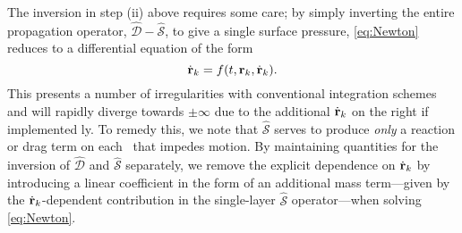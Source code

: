 The inversion in step (ii) above requires some care; by simply inverting the entire propagation operator, $\hat{\mathcal{D}} - \hat{\mathcal{S}}$, to give a single surface pressure, \cref{eq:Newton} reduces to a differential equation of the form
\begin{equation}
  \label{eq:malformed}
  \dot{\vb{r}}_k = f(t, \vb{r}_k, \dot{\vb{r}}_k).
\end{equation}
This presents a number of irregularities with conventional integration schemes and will rapidly diverge towards $\pm \infty$ due to the additional $\dot{\vb{r}}_k$ on the right if implemented \naive ly.
To remedy this, we note that $\hat{\mathcal{S}}$ serves to produce \emph{only} a reaction or drag term on each \bubble\ that impedes motion.
By maintaining quantities for the inversion of $\hat{\mathcal{D}}$ and $\hat{\mathcal{S}}$ separately, we remove the explicit dependence on $\dot{\vb{r}}_k$ by introducing a linear coefficient in the form of an additional mass term---given by the $\dot{\vb{r}}_k$-dependent contribution in the single-layer $\hat{\mathcal{S}}$ operator---when solving \cref{eq:Newton}.
